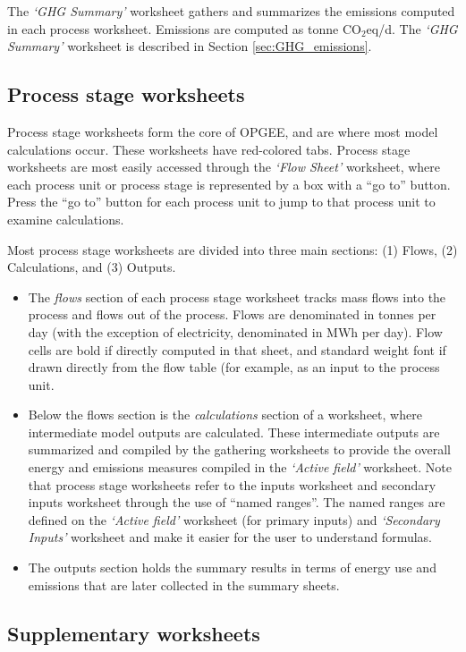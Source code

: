 \documentclass[11pt]{report}
\newcommand{\sheet}[1]{\textit{`{#1}'}}
\begin{document}
The \sheet{GHG Summary} worksheet gathers and summarizes the emissions computed in each process worksheet. Emissions are computed as tonne CO$_2$eq/d. The \sheet{GHG Summary} worksheet is described in Section \ref{sec:GHG_emissions}.

\subsection{Process stage worksheets} 

Process stage worksheets form the core of OPGEE, and are where most model calculations occur. These worksheets have red-colored tabs.
Process stage worksheets are most easily accessed through the \sheet{Flow Sheet} worksheet, where each process unit or process stage is represented by a box with a ``go to'' button. Press the ``go to'' button for each process unit to jump to that process unit to examine calculations. 

Most process stage worksheets are divided into three main sections: (1) Flows, (2) Calculations, and (3) Outputs.

\begin{itemize}
\item The \emph{flows} section of each process stage worksheet tracks mass flows into the process and flows out of the process. Flows are denominated in tonnes per day (with the exception of electricity, denominated in MWh per day). 
Flow cells are bold if directly computed in that sheet, and standard weight font if drawn directly from the flow table (for example, as an input to the process unit.
\item Below the flows section is the \emph{calculations} section of a worksheet, where intermediate model outputs are calculated. These intermediate outputs are summarized and compiled by the gathering worksheets to provide the overall energy and emissions measures compiled in the \sheet{Active field} worksheet.
Note that process stage worksheets refer to the inputs worksheet and secondary inputs worksheet through the use of ``named ranges''. The named ranges are defined on the \sheet{Active field} worksheet (for primary inputs) and \sheet{Secondary Inputs} worksheet and make it easier for the user to understand formulas.
\item The outputs section holds the summary results in terms of energy use and emissions that are later collected in the summary sheets.
\end{itemize}

\subsection{Supplementary worksheets} 
\end{document}
